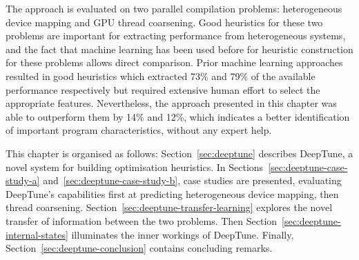 The approach is evaluated on two parallel compilation problems: heterogeneous device mapping and GPU thread coarsening. Good heuristics for these two problems are important for extracting performance from heterogeneous systems, and the fact that machine learning has been used before for heuristic construction for these problems allows direct comparison. Prior machine learning approaches resulted in good heuristics which extracted 73\% and 79\% of the available performance respectively but required extensive human effort to select the appropriate features. Nevertheless, the approach presented in this chapter was able to outperform them by 14\% and 12\%, which indicates a better identification of important program characteristics, without any expert help.

This chapter is organised as follows: Section~\ref{sec:deeptune} describes DeepTune, a novel system for building optimisation heuristics. In Sections~\ref{sec:deeptune-case-study-a} and~\ref{sec:deeptune-case-study-b}, case studies are presented, evaluating DeepTune's capabilities first at predicting heterogeneous device mapping, then thread coarsening. Section~\ref{sec:deeptune-transfer-learning} explores the novel transfer of information between the two problems. Then Section~\ref{sec:deeptune-internal-states} illuminates the inner workings of DeepTune. Finally, Section~\ref{sec:deeptune-conclusion} contains concluding remarks.
